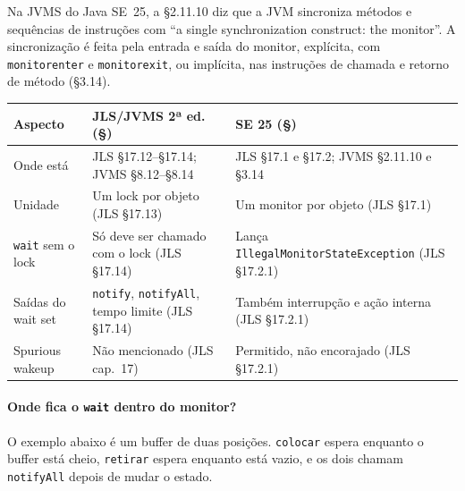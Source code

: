 Na JVMS do Java SE~25, a §2.11.10 diz que a JVM sincroniza métodos e
sequências de instruções com \enquote{a single synchronization
construct: the monitor}. A sincronização é feita pela entrada e saída
do monitor, explícita, com \texttt{monitorenter} e \texttt{monitorexit},
ou implícita, nas instruções de chamada e retorno de método (§3.14).

\begin{center}
\begin{tabular}{@{}p{}p{}p{}@{}}
\toprule
Aspecto & JLS/JVMS 2ª ed. (§) & SE 25 (§) \\
\midrule
Onde está & JLS §17.12--§17.14; JVMS §8.12--§8.14 & JLS §17.1 e
§17.2; JVMS §2.11.10 e §3.14 \\
Unidade & Um lock por objeto (JLS §17.13) & Um monitor por objeto
(JLS §17.1) \\
\texttt{wait} sem o lock & Só deve ser chamado com o lock (JLS §17.14)
& Lança \texttt{IllegalMonitor\-StateException} (JLS §17.2.1) \\
Saídas do wait set & \texttt{notify}, \texttt{notifyAll}, tempo limite
(JLS §17.14) & Também interrupção e ação interna (JLS §17.2.1) \\
Spurious wakeup & Não mencionado (JLS cap.~17) & Permitido, não
encorajado (JLS §17.2.1) \\
\bottomrule
\end{tabular}
\end{center}

\paragraph{Onde fica o \texttt{wait} dentro do monitor?}
O exemplo abaixo é um buffer de duas posições. \texttt{colocar} espera
enquanto o buffer está cheio, \texttt{retirar} espera enquanto está
vazio, e os dois chamam \texttt{notifyAll} depois de mudar o estado.




